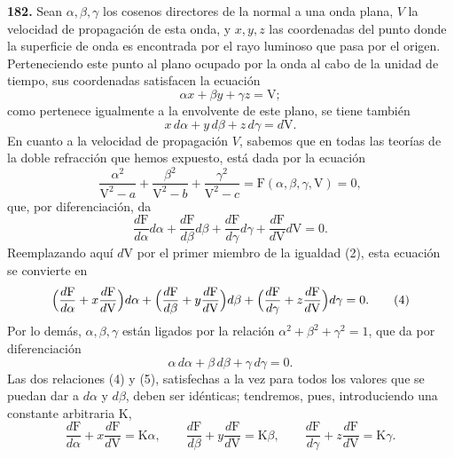 \noindent\textbf{182.} Sean $\alpha,\beta,\gamma$ los cosenos directores
de la normal a una onda plana, $V$ la velocidad de propagación de esta
onda, y $x,y,z$ las coordenadas del punto donde la superficie de onda es
encontrada por el rayo luminoso que pasa por el origen. Perteneciendo
este punto al plano ocupado por la onda al cabo de la unidad de tiempo,
sus coordenadas satisfacen la ecuación
\begin{equation}
\alpha x+\beta y+\gamma z=\mathrm V;
\tag{1}
\end{equation}
como pertenece igualmente a la envolvente de este plano, se tiene también
\begin{equation}
x\,d\alpha+y\,d\beta+z\,d\gamma=d\mathrm V.
\tag{2}
\end{equation}
En cuanto a la velocidad de propagación $V$, sabemos que en todas las
teorías de la doble refracción que hemos expuesto, está dada por la
ecuación
\begin{equation}
\frac{\alpha^2}{\mathrm V^2-a}+\frac{\beta^2}{\mathrm V^2-b}+\frac{\gamma^2}{\mathrm V^2-c}=\mathrm F(\alpha,\beta,\gamma,\mathrm V)=0,
\tag{3}
\end{equation}
que, por diferenciación, da
\[
\frac{d\mathrm F}{d\alpha}d\alpha+\frac{d\mathrm F}{d\beta}d\beta+\frac{d\mathrm F}{d\gamma}d\gamma+\frac{d\mathrm F}{d\mathrm V}d\mathrm V=0.
\]
Reemplazando aquí $d\mathrm V$ por el primer miembro de la igualdad (2),
esta ecuación se convierte en
\begin{equation}
\Bigl(\frac{d\mathrm F}{d\alpha}+x\frac{d\mathrm F}{d\mathrm V}\Bigr)d\alpha
+\Bigl(\frac{d\mathrm F}{d\beta}+y\frac{d\mathrm F}{d\mathrm V}\Bigr)d\beta
+\Bigl(\frac{d\mathrm F}{d\gamma}+z\frac{d\mathrm F}{d\mathrm V}\Bigr)d\gamma=0.
\tag{4}
\end{equation}
Por lo demás, $\alpha,\beta,\gamma$ están ligados por la relación
$\alpha^2+\beta^2+\gamma^2=1$, que da por diferenciación
\begin{equation}
\alpha\,d\alpha+\beta\,d\beta+\gamma\,d\gamma=0.
\tag{5}
\end{equation}
Las dos relaciones (4) y (5), satisfechas a la vez para todos los valores
que se puedan dar a $d\alpha$ y $d\beta$, deben ser idénticas; tendremos,
pues, introduciendo una constante arbitraria $\mathrm K$,
\begin{equation}
\frac{d\mathrm F}{d\alpha}+x\frac{d\mathrm F}{d\mathrm V}=\mathrm K\alpha,\qquad
\frac{d\mathrm F}{d\beta}+y\frac{d\mathrm F}{d\mathrm V}=\mathrm K\beta,\qquad
\frac{d\mathrm F}{d\gamma}+z\frac{d\mathrm F}{d\mathrm V}=\mathrm K\gamma.
\tag{6}
\end{equation}

